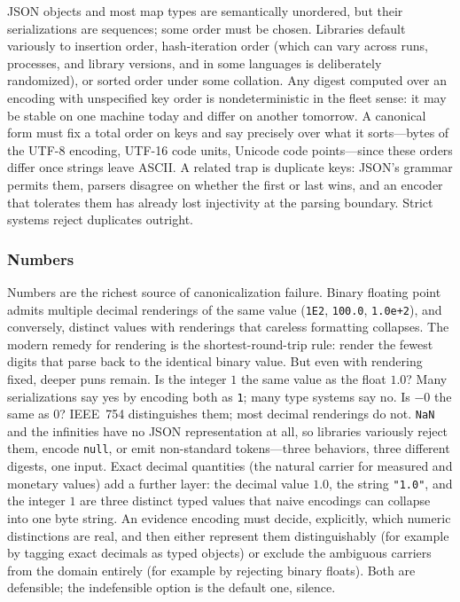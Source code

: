 JSON objects and most map types are semantically unordered, but their
serializations are sequences; some order must be chosen. Libraries
default variously to insertion order, hash-iteration order (which can
vary across runs, processes, and library versions, and in some
languages is deliberately randomized), or sorted order under some
collation. Any digest computed over an encoding with unspecified key
order is nondeterministic in the fleet sense: it may be stable on one
machine today and differ on another tomorrow. A canonical form must
fix a total order on keys and say precisely over what it sorts---bytes
of the UTF-8 encoding, UTF-16 code units, Unicode code points---since
these orders differ once strings leave ASCII. A related trap is
duplicate keys: JSON's grammar permits them, parsers disagree on
whether the first or last wins, and an encoder that tolerates them has
already lost injectivity at the parsing boundary. Strict systems
reject duplicates outright.

\subsubsection{Numbers}\label{ch02:canon-numbers}

Numbers are the richest source of canonicalization failure. Binary
floating point admits multiple decimal renderings of the same value
(\texttt{1E2}, \texttt{100.0}, \texttt{1.0e+2}), and conversely,
distinct values with renderings that careless formatting collapses.
The modern remedy for rendering is the shortest-round-trip rule:
render the fewest digits that parse back to the identical binary
value. But even with rendering fixed, deeper puns remain. Is the
integer $1$ the same value as the float $1.0$? Many serializations
say yes by encoding both as \texttt{1}; many type systems say no. Is
$-0$ the same as $0$? IEEE~754 distinguishes them; most decimal
renderings do not. \texttt{NaN} and the infinities have no JSON
representation at all, so libraries variously reject them, encode
\texttt{null}, or emit non-standard tokens---three behaviors, three
different digests, one input. Exact decimal quantities (the natural
carrier for measured and monetary values) add a further layer: the
decimal value $1.0$, the string \texttt{"1.0"}, and the integer $1$
are three distinct typed values that naive encodings can collapse
into one byte string. An evidence encoding must decide, explicitly,
which numeric distinctions are real, and then either represent them
distinguishably (for example by tagging exact decimals as typed
objects) or exclude the ambiguous carriers from the domain entirely
(for example by rejecting binary floats). Both are defensible; the
indefensible option is the default one, silence.

